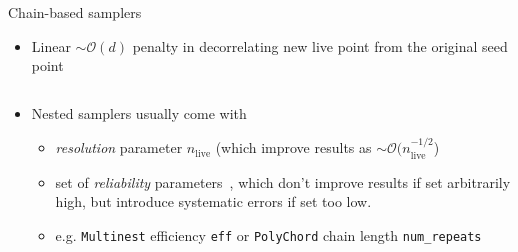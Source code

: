 \documentclass[aspectratio=169,handout]{beamer}
\begin{document}
\begin{frame}
\begin{columns}[t]
\begin{block}{Chain-based samplers}
\begin{itemize}
                \item Linear $\sim\mathcal{O}(d)$ penalty in decorrelating new live point from the original seed point
            \end{itemize}
        \end{block}
    \end{columns}
    \vspace{15pt}
    \begin{itemize}
        \item Nested samplers usually come with 
            \begin{itemize}
                \item \emph{resolution} parameter $n_\mathrm{live}$ (which improve results as $\sim\mathcal{O}(n_\mathrm{live}^{-1/2}$)
                    \item set of \emph{reliability} parameters~, which don't improve results if set arbitrarily high, but introduce systematic errors if set too low.
                \item e.g. \texttt{Multinest} efficiency \texttt{eff} or \texttt{PolyChord} chain length \texttt{num\_repeats}
            \end{itemize}
    \end{itemize}
\end{frame}
\end{document}
